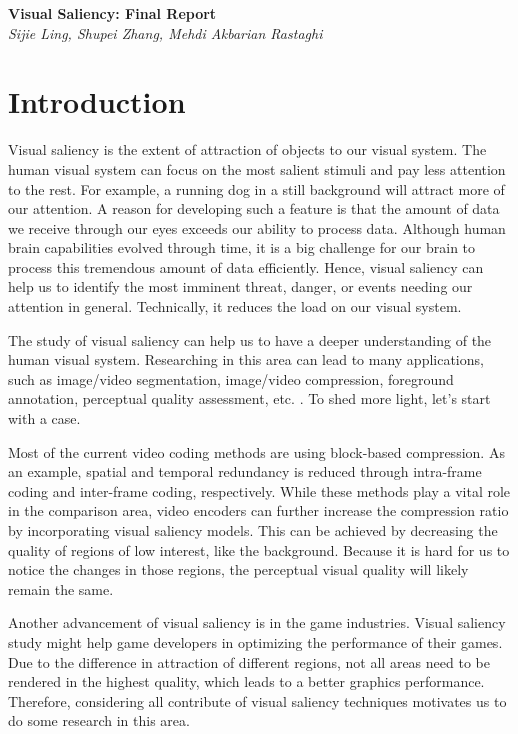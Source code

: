 \documentclass[12pt]{article}
\begin{document}
\begin{center}
{\bf \Large Visual Saliency: Final Report}  \\
\vspace{.1in}
{\em Sijie Ling, Shupei Zhang, Mehdi Akbarian Rastaghi}
\end{center}
\section{Introduction}

Visual saliency is the extent of attraction of objects to our visual system. 
The human visual system can focus on the most salient stimuli and pay less attention to the rest. 
For example, a running dog in a still background will attract more of our attention. 
A reason for developing such a feature is that the amount of data we receive through our eyes exceeds our ability to process data. 
Although human brain capabilities evolved through time, it is a big challenge for our brain to process this tremendous amount of data efficiently. 
Hence, visual saliency can help us to identify the most imminent threat, danger, or events needing our attention in general. 
Technically, it reduces the load on our visual system. 

The study of visual saliency can help us to have a deeper understanding of the human visual system. 
Researching in this area can lead to many applications, such as image/video segmentation, image/video compression, foreground annotation, perceptual quality assessment, etc. \cite{congReviewVisualSaliency2019}.  
To shed more light, let's start with a case. 

Most of the current video coding methods are using block-based compression. 
As an example, spatial and temporal redundancy is reduced through intra-frame coding and inter-frame coding, respectively\cite{sullivanOverviewHighEfficiency2012}. 
While these methods play a vital role in the comparison area, video encoders can further increase the compression ratio by incorporating visual saliency models. 
This can be achieved by decreasing the quality of regions of low interest, like the background. 
Because it is hard for us to notice the changes in those regions, the perceptual visual quality will likely remain the same.

Another advancement of visual saliency is in the game industries. 
Visual saliency study might help game developers in optimizing the performance of their games. 
Due to the difference in attraction of different regions, not all areas need to be rendered in the highest quality, which leads to a better graphics performance. 
Therefore, considering all contribute of visual saliency techniques motivates us to do some research in this area. 
\end{document}
